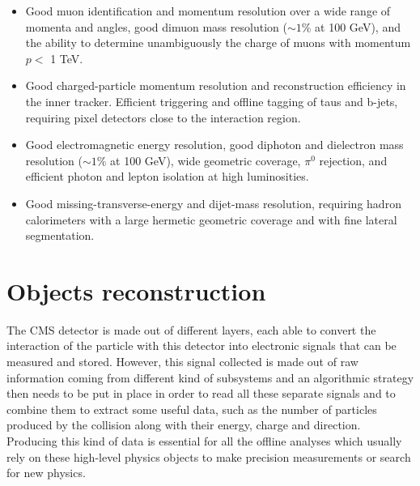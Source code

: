 \documentclass[a4paper, 10pt, openright]{report}
\begin{document}
\begin{itemize}
\item Good muon identification and momentum resolution over a wide range of momenta and angles, good dimuon mass resolution ($\sim 1$\% at 100 GeV), and the ability to determine unambiguously the charge of muons with momentum $p <$ 1 TeV.
\item Good charged-particle momentum resolution and reconstruction efficiency in the inner tracker. Efficient triggering and offline tagging of taus and b-jets, requiring pixel detectors close to the interaction region.
\item Good electromagnetic energy resolution, good diphoton and dielectron mass resolution ($\sim 1$\% at 100 GeV), wide geometric coverage, $\pi^0$ rejection, and efficient photon and lepton isolation at high luminosities.
\item Good missing-transverse-energy and dijet-mass resolution, requiring hadron calorimeters with a large hermetic geometric coverage and with fine lateral segmentation.
\end{itemize}




























\chapter{Objects reconstruction} \label{chapter:Reco}

The \ac{CMS} detector is made out of different layers, each able to convert the interaction of the particle with this detector into electronic signals that can be measured and stored. However, this signal collected is made out of raw information coming from different kind of subsystems and an algorithmic strategy then needs to be put in place in order to read all these separate signals and to combine them to extract some useful data, such as the number of particles produced by the collision along with their energy, charge and direction. Producing this kind of data is essential for all the offline analyses which usually rely on these high-level physics objects to make precision measurements or search for new physics. 
\end{document}
